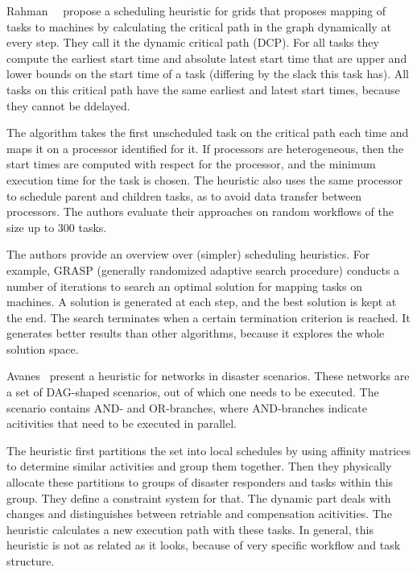 \documentclass[conference]{IEEEtran}
\begin{document}
    Rahman~\etal~\cite{rahman2013} propose a scheduling heuristic for grids that proposes mapping of tasks to machines by calculating
    the critical path in the graph dynamically at every step.
    They call it the dynamic critical path (DCP).
    For all tasks they compute the earliest start time and absolute latest start time that are upper and lower bounds
    on the start time of a task (differing by the slack this task has).
    All tasks on this critical path have the same earliest and latest start times, because they cannot be ddelayed.

    The algorithm takes the first unscheduled task on the critical path each time and maps it on a processor identified for it.
    If processors are heterogeneous, then the start times are computed with respect for the processor, and the minimum execution time for
    the task is chosen.
    The heuristic also uses the same processor to schedule parent and children tasks, as to avoid data transfer between processors.
    The authors evaluate their approaches on random workflows of the size up to 300 tasks.

    The authors provide an overview over (simpler) scheduling heuristics.
    For example, GRASP (generally randomized adaptive search procedure) conducts a number of iterations to search an optimal
    solution for mapping tasks on machines.
    A solution is generated at each step, and the best solution is kept at the end.
    The search terminates when a certain termination criterion is reached.
    It generates better results than other algorithms, because it explores the whole solution space.

    Avanes~\etal\cite{avanes2008adaptive} present a heuristic for networks in disaster scenarios.
    These networks are a set of DAG-shaped scenarios, out of which one needs to be executed.
    The scenario contains AND- and OR-branches, where AND-branches indicate acitivities that need to be executed in parallel.

    The heuristic first partitions the set into local schedules by using affinity matrices to determine similar
    activities and group them together.
    Then they physically allocate these partitions to groups of disaster responders and tasks within this group.
    They define a constraint system for that.
    The dynamic part deals with changes and distinguishes between retriable and compensation acitivities.
    The heuristic calculates a new execution path with these tasks.
    In general, this heuristic is not as related as it looks, because of very specific workflow and task structure.
\end{document}

